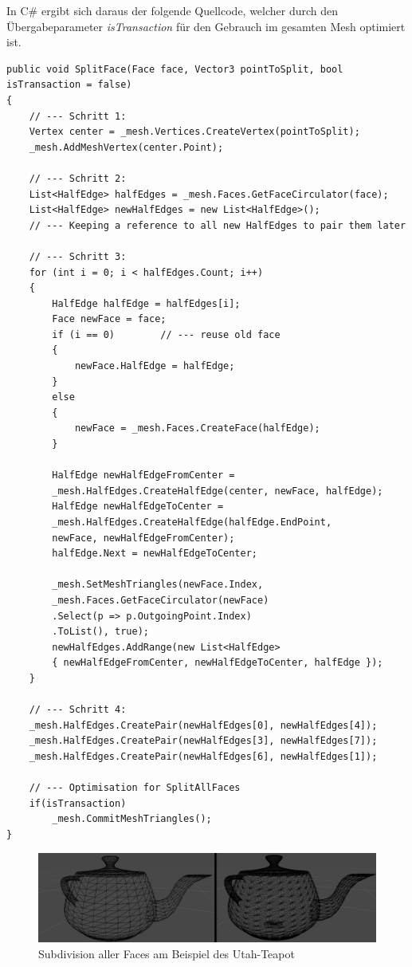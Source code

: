 In C\# ergibt sich daraus der folgende Quellcode, welcher durch den \"Ubergabeparameter \textit{isTransaction} f\"ur den Gebrauch im gesamten Mesh optimiert ist.
\begin{lstlisting}
public void SplitFace(Face face, Vector3 pointToSplit, bool isTransaction = false)
{
	// --- Schritt 1:
	Vertex center = _mesh.Vertices.CreateVertex(pointToSplit);
	_mesh.AddMeshVertex(center.Point);

	// --- Schritt 2:
	List<HalfEdge> halfEdges = _mesh.Faces.GetFaceCirculator(face);
	List<HalfEdge> newHalfEdges = new List<HalfEdge>(); 
	// --- Keeping a reference to all new HalfEdges to pair them later

	// --- Schritt 3:
	for (int i = 0; i < halfEdges.Count; i++)
	{
		HalfEdge halfEdge = halfEdges[i];
		Face newFace = face;
		if (i == 0)        // --- reuse old face
		{
			newFace.HalfEdge = halfEdge;
		}
		else
		{
			newFace = _mesh.Faces.CreateFace(halfEdge);
		}

		HalfEdge newHalfEdgeFromCenter =
		_mesh.HalfEdges.CreateHalfEdge(center, newFace, halfEdge);
		HalfEdge newHalfEdgeToCenter =
		_mesh.HalfEdges.CreateHalfEdge(halfEdge.EndPoint, 
		newFace, newHalfEdgeFromCenter);
		halfEdge.Next = newHalfEdgeToCenter;

		_mesh.SetMeshTriangles(newFace.Index,
		_mesh.Faces.GetFaceCirculator(newFace)
		.Select(p => p.OutgoingPoint.Index)
		.ToList(), true);
		newHalfEdges.AddRange(new List<HalfEdge>
		{ newHalfEdgeFromCenter, newHalfEdgeToCenter, halfEdge });
	}
	
	// --- Schritt 4:
	_mesh.HalfEdges.CreatePair(newHalfEdges[0], newHalfEdges[4]);
	_mesh.HalfEdges.CreatePair(newHalfEdges[3], newHalfEdges[7]);
	_mesh.HalfEdges.CreatePair(newHalfEdges[6], newHalfEdges[1]);

	// --- Optimisation for SplitAllFaces
	if(isTransaction)
		_mesh.CommitMeshTriangles();
}
\end{lstlisting}
\begin{figure}[H]
	\centering
	\includegraphics[width=0.9\linewidth]{Images/SubdivisionDemo}
	\caption{Subdivision aller Faces am Beispiel des Utah-Teapot}
	\label{fig:subdivisiondemo}
\end{figure}


